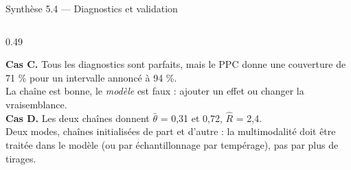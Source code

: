 \begin{frame}{Synthèse 5.4 --- Diagnostics et validation}
\begin{columns}[t]
\begin{column}{0.49\textwidth}
\begin{qbox}
\textbf{Cas C.} Tous les diagnostics sont parfaits, mais le PPC donne une
couverture de 71 \% pour un intervalle annoncé à 94 \%.
\\ \footnotesize La chaîne est bonne, le \emph{modèle} est faux : ajouter un effet
ou changer la vraisemblance.\\[1.5mm]
\textbf{Cas D.} Les deux chaînes donnent $\bar\theta$ = 0,31 et 0,72, $\hat R$ = 2,4.
\\ \footnotesize Deux modes, chaînes initialisées de part et d'autre : la multimodalité
doit être traitée dans le modèle (ou par échantillonnage par tempérage), pas par
plus de tirages.
\end{qbox}
\end{column}
\end{columns}
\end{frame}

